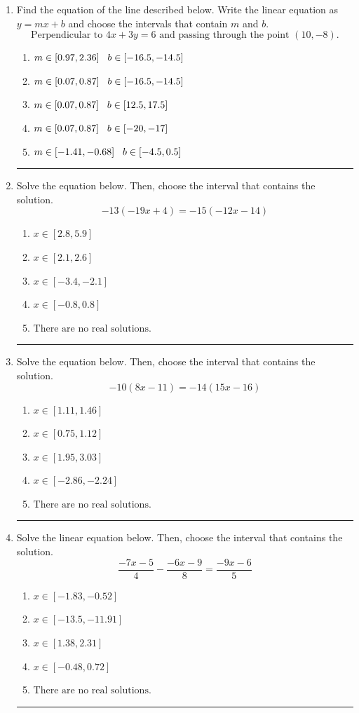 \documentclass[14pt]{extbook}
\newcommand{\litem}[1]{\item#1\hspace*{-1cm}\rule{\textwidth}{0.4pt}}
\begin{document}
\begin{enumerate}
\litem{
Find the equation of the line described below. Write the linear equation as $ y=mx+b $ and choose the intervals that contain $m$ and $b$.\[ \text{Perpendicular to } 4 x + 3 y = 6 \text{ and passing through the point } (10, -8). \]\begin{enumerate}[label=\Alph*.]
\item \( m \in [0.97, 2.36] \hspace*{3mm} b \in [-16.5, -14.5] \)
\item \( m \in [0.07, 0.87] \hspace*{3mm} b \in [-16.5, -14.5] \)
\item \( m \in [0.07, 0.87] \hspace*{3mm} b \in [12.5, 17.5] \)
\item \( m \in [0.07, 0.87] \hspace*{3mm} b \in [-20, -17] \)
\item \( m \in [-1.41, -0.68] \hspace*{3mm} b \in [-4.5, 0.5] \)

\end{enumerate} }
\litem{
Solve the equation below. Then, choose the interval that contains the solution.\[ -13(-19x + 4) = -15(-12x -14) \]\begin{enumerate}[label=\Alph*.]
\item \( x \in [2.8, 5.9] \)
\item \( x \in [2.1, 2.6] \)
\item \( x \in [-3.4, -2.1] \)
\item \( x \in [-0.8, 0.8] \)
\item \( \text{There are no real solutions.} \)

\end{enumerate} }
\litem{
Solve the equation below. Then, choose the interval that contains the solution.\[ -10(8x -11) = -14(15x -16) \]\begin{enumerate}[label=\Alph*.]
\item \( x \in [1.11, 1.46] \)
\item \( x \in [0.75, 1.12] \)
\item \( x \in [1.95, 3.03] \)
\item \( x \in [-2.86, -2.24] \)
\item \( \text{There are no real solutions.} \)

\end{enumerate} }
\litem{
Solve the linear equation below. Then, choose the interval that contains the solution.\[ \frac{-7x -5}{4} - \frac{-6x -9}{8} = \frac{-9x -6}{5} \]\begin{enumerate}[label=\Alph*.]
\item \( x \in [-1.83, -0.52] \)
\item \( x \in [-13.5, -11.91] \)
\item \( x \in [1.38, 2.31] \)
\item \( x \in [-0.48, 0.72] \)
\item \( \text{There are no real solutions.} \)


\end{enumerate}}
\end{enumerate}
\end{document}
